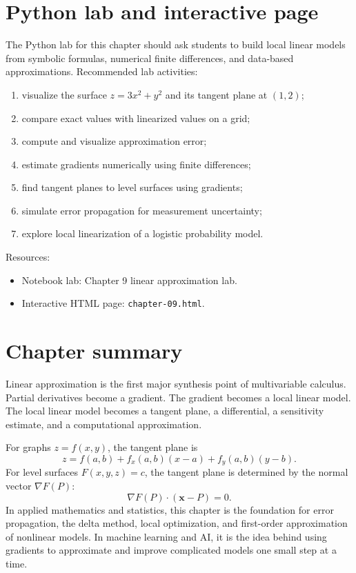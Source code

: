 \documentclass[11pt]{article}
\newcommand{\grad}{\nabla}
\begin{document}
\section{Python lab and interactive page}

The Python lab for this chapter should ask students to build local linear models from symbolic formulas, numerical finite differences, and data-based approximations. Recommended lab activities:
\begin{enumerate}
  \item visualize the surface $z=3x^2+y^2$ and its tangent plane at $(1,2)$;
  \item compare exact values with linearized values on a grid;
  \item compute and visualize approximation error;
  \item estimate gradients numerically using finite differences;
  \item find tangent planes to level surfaces using gradients;
  \item simulate error propagation for measurement uncertainty;
  \item explore local linearization of a logistic probability model.
\end{enumerate}

Resources:
\begin{itemize}
  \item Notebook lab: Chapter 9 linear approximation lab.
  \item Interactive HTML page: \texttt{chapter-09.html}.
\end{itemize}

\section{Chapter summary}

Linear approximation is the first major synthesis point of multivariable calculus. Partial derivatives become a gradient. The gradient becomes a local linear model. The local linear model becomes a tangent plane, a differential, a sensitivity estimate, and a computational approximation.

For graphs $z=f(x,y)$, the tangent plane is
\[
z=f(a,b)+f_x(a,b)(x-a)+f_y(a,b)(y-b).
\]
For level surfaces $F(x,y,z)=c$, the tangent plane is determined by the normal vector $\grad F(P)$:
\[
\grad F(P)\cdot(\mathbf{x}-P)=0.
\]
In applied mathematics and statistics, this chapter is the foundation for error propagation, the delta method, local optimization, and first-order approximation of nonlinear models. In machine learning and AI, it is the idea behind using gradients to approximate and improve complicated models one small step at a time.
\end{document}
